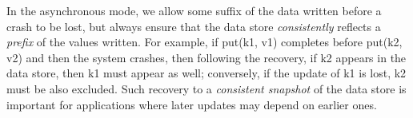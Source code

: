 In the asynchronous mode, we allow some suffix of the  data written before a crash to be lost, but always 
ensure that the data store \emph{consistently} reflects a \emph{prefix} of the  values written.
For example, if put(k1, v1) completes before put(k2, v2) and then the system crashes, then following the recovery, 
if k2 appears in the data store, then k1 must appear as well; conversely, if the update of k1 is lost, k2 must be also excluded.
Such recovery to a \emph{consistent snapshot} of the data store is important for applications where later updates may depend on earlier ones. 










